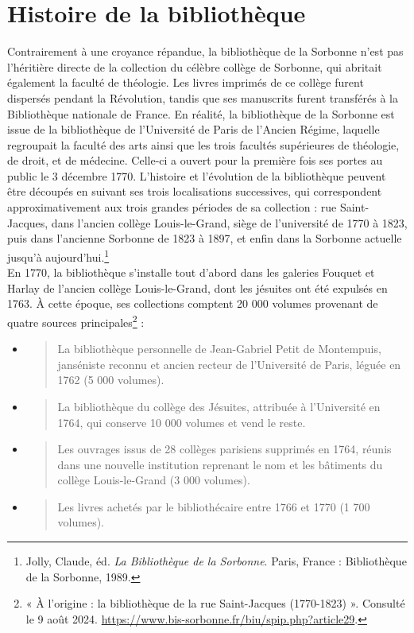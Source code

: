 \documentclass[a4paper,12pt,twoside]{book}
\begin{document}
\section{Histoire de la bibliothèque}
Contrairement à une croyance répandue, la bibliothèque de la Sorbonne
n'est pas l'héritière directe de la
collection du célèbre collège de Sorbonne, qui abritait également la
faculté de théologie. Les livres imprimés de ce collège furent dispersés
pendant la Révolution, tandis que ses manuscrits furent transférés à la
Bibliothèque nationale de France. En réalité, la bibliothèque de la
Sorbonne est issue de la bibliothèque de l'Université de
Paris de l'Ancien Régime, laquelle regroupait la faculté
des arts ainsi que les trois facultés supérieures de théologie, de
droit, et de médecine. Celle-ci a ouvert pour la première fois ses
portes au public le 3 décembre 1770. L'histoire et
l'évolution de la bibliothèque peuvent être découpés en
suivant ses trois localisations successives, qui correspondent
approximativement aux trois grandes périodes de sa collection : rue
Saint-Jacques, dans l'ancien collège Louis-le-Grand,
siège de l'université de 1770 à 1823, puis dans
l'ancienne Sorbonne de 1823 à 1897, et enfin dans la
Sorbonne actuelle jusqu'à aujourd'hui.\footnote{Jolly, Claude, éd.
	\emph{La Bibliothèque de la Sorbonne}. Paris, France : Bibliothèque de
	la Sorbonne, 1989.} \\

En 1770, la bibliothèque s'installe tout d'abord dans les galeries
Fouquet et Harlay de l'ancien collège Louis-le-Grand, dont les jésuites
ont été expulsés en 1763. À cette époque, ses collections comptent 20
000 volumes provenant de quatre sources principales\footnote{« À
	l'origine : la bibliothèque de la rue Saint-Jacques (1770-1823) ».
	Consulté le 9 août 2024.
	\url{https://www.bis-sorbonne.fr/biu/spip.php?article29}.}
: \\

\begin{itemize}
	\item
	\begin{quote}
		La bibliothèque personnelle de Jean-Gabriel Petit de Montempuis,
		janséniste reconnu et ancien recteur de l'Université de Paris, léguée
		en 1762 (5 000 volumes).
	\end{quote}
	\item
	\begin{quote}
		La bibliothèque du collège des Jésuites, attribuée à l'Université en
		1764, qui conserve 10 000 volumes et vend le reste.
	\end{quote}
	\item
	\begin{quote}
		Les ouvrages issus de 28 collèges parisiens supprimés en 1764, réunis
		dans une nouvelle institution reprenant le nom et les bâtiments du
		collège Louis-le-Grand (3 000 volumes).
	\end{quote}
	\item
	\begin{quote}
		Les livres achetés par le bibliothécaire entre 1766 et 1770 (1 700
		volumes). \\
	\end{quote}
\end{itemize}
\end{document}
